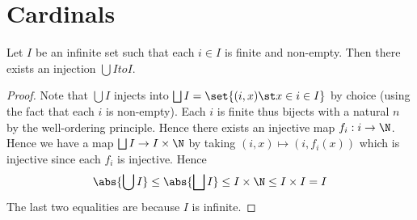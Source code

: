 \section{Cardinals}



\begin{lem}
    Let $I$ be an infinite set such that each $i \in I$ is finite and 
    non-empty.
    Then there exists an injection $\bigcup I to I$.
\end{lem}
\begin{proof}
    Note that $\bigcup I$ injects into 
    $\bigsqcup I = \set{(i,x) \st x \in i \in I}$ by choice 
    (using the fact that each $i$ is non-empty).
    Each $i$ is finite thus bijects with a natural $n$ 
    by the well-ordering principle.
    Hence there exists an injective map $f_i : i \to \N$.
    Hence we have a map $\bigsqcup I \to I \times \N$ by taking 
    $(i,x) \mapsto (i,f_i(x))$ which is injective since each $f_i$ is injective.
    Hence 
    \[\abs{\bigcup I} \leq \abs{\bigsqcup I} \leq I \times \N \leq 
    I \times I = I\]
    The last two equalities are because $I$ is infinite.
\end{proof}
